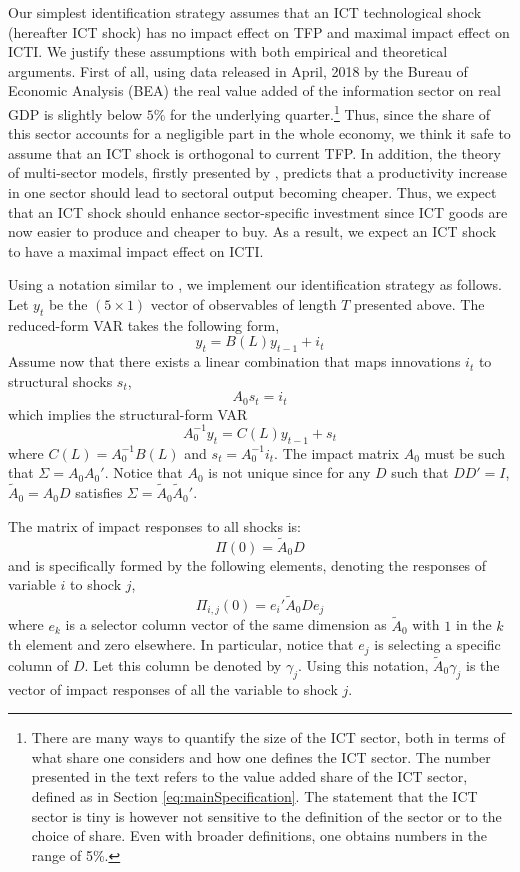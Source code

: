 \documentclass[12pt]{article}
\begin{document}
Our simplest identification strategy assumes that an ICT technological shock (hereafter ICT shock) has no impact effect on TFP and maximal impact effect on ICTI. We justify these assumptions with both empirical and theoretical arguments. First of all, using data released in April, 2018 by the Bureau of Economic Analysis (BEA) the real value added of the information sector on real GDP is slightly below $5$\% for the underlying quarter.\footnote{There are many ways to quantify the size of the ICT sector, both in terms of what share one considers and how one defines the ICT sector. The number presented in the text refers to the value added share of the ICT sector, defined as in Section \ref{eq:mainSpecification}. The statement that the ICT sector is tiny is however not sensitive to the definition of the sector or to the choice of share. Even with broader definitions, one obtains numbers in the range of 5\%.} Thus, since the share of this sector accounts for a negligible part in the whole economy, we think it safe to assume that an ICT shock is orthogonal to current TFP. In addition, the theory of multi-sector models, firstly presented by \cite{greenwood1997long}, predicts that a productivity increase in one sector should lead to sectoral output becoming cheaper. Thus, we expect that an ICT shock should enhance sector-specific investment since ICT goods are now easier to produce and cheaper to buy. As a result, we expect an ICT shock to have a maximal impact effect on ICTI. 

Using a notation similar to \cite{barsky2011news}, we implement our identification strategy as follows. Let $y_t$ be the $(5 \times 1)$ vector of observables of length $T$ presented above. The reduced-form VAR takes the following form,
$$
y_t = B(L)y_{t-1} + i_t 
$$
Assume now that there exists a linear combination that maps innovations $i_t$ to structural shocks $s_t$,
$$
A_0 s_t = i_t
$$
which implies the structural-form VAR
$$
A_0^{-1}y_t = C(L) y_{t-1} + s_t
$$
where $C(L) = A_0^{-1} B(L)$ and $s_t = A_0^{-1} i_t$. The impact matrix $A_0$ must be such that $\Sigma = A_0 A_0'$. Notice that $A_0$ is not unique since for any $D$ such that $DD' = I$, $\tilde{A}_0 = A_0 D$ satisfies $\Sigma = \tilde{A}_0 \tilde{A}_0'$. 

The matrix of impact responses to all shocks is: %
$$
\Pi(0) = \tilde{A}_0 D
$$
and is specifically formed by the following elements, denoting the responses of variable $i$ to shock $j$, %
$$
\Pi_{i,j}(0) = e_i' \tilde{A}_0 D e_j
$$
where $e_k$ is a selector column vector of the same dimension as $\tilde{A}_0$ with $1$ in the $k$th element and zero elsewhere. In particular, notice that $e_j$ is selecting a specific column of $D$. Let this column be denoted by $\gamma_j$. Using this notation, $\tilde{A}_0\gamma_j$ is the vector of impact responses of all the variable to shock $j$.
\end{document}
